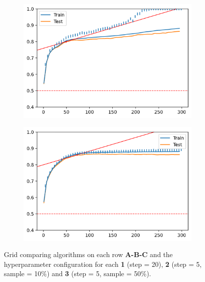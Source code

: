 \begin{figure}[H]
\begin{subfigure}[b]{0.32\linewidth}
        \includegraphics[width=\linewidth]{img/300-s5-p01.png}
    \end{subfigure}
    \begin{subfigure}[b]{0.32\linewidth}
        \includegraphics[width=\linewidth]{img/300-s5-p05.png}
    \end{subfigure}
    \caption{Grid comparing algorithms on each row \textbf{A-B-C} and the hyperparameter configuration for each \textbf{1} (step = 20), \textbf{2} (step = 5, sample = 10\%) and \textbf{3} (step = 5, sample = 50\%).}
    \label{fig:dynamicStep.vanilla.comp}
\end{figure}

